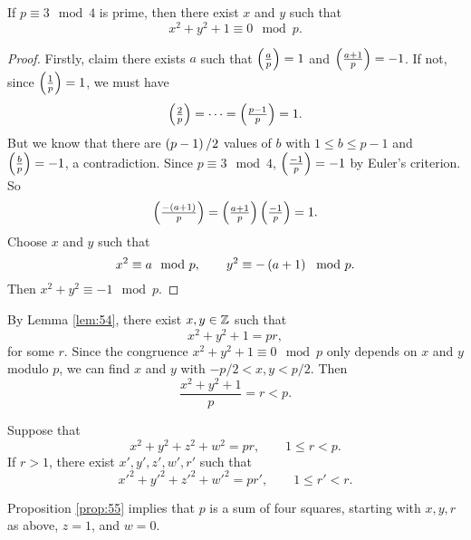 
\begin{lemma}
\label{lem:54}
If $ p \equiv 3 \mod 4 $ is prime, then there exist $ x $ and $ y $ such that
$$ x^2 + y^2 + 1 \equiv 0 \mod p. $$
\end{lemma}

\begin{proof}
Firstly, claim there exists $ a $ such that $ \symbol{a}{p} = 1 $ and $ \symbol{a + 1}{p} = -1 $. If not, since $ \symbol{1}{p} = 1 $, we must have
$$ \symbol{2}{p} = \dots = \symbol{p - 1}{p} = 1. $$
But we know that there are $ \br{p - 1} / 2 $ values of $ b $ with $ 1 \le b \le p - 1 $ and $ \symbol{b}{p} = -1 $, a contradiction. Since $ p \equiv 3 \mod 4 $, $ \symbol{-1}{p} = -1 $ by Euler's criterion. So
$$ \symbol{-\br{a + 1}}{p} = \symbol{a + 1}{p}\symbol{-1}{p} = 1. $$
Choose $ x $ and $ y $ such that
$$ x^2 \equiv a \mod p, \qquad y^2 \equiv -\br{a + 1} \mod p. $$
Then $ x^2 + y^2 \equiv -1 \mod p $.
\end{proof}

By Lemma \ref{lem:54}, there exist $ x, y \in \mathbb{Z} $ such that
$$ x^2 + y^2 + 1 = pr, $$
for some $ r $. Since the congruence $ x^2 + y^2 + 1 \equiv 0 \mod p $ only depends on $ x $ and $ y $ modulo $ p $, we can find $ x $ and $ y $ with $ -p / 2 < x, y < p / 2 $. Then
$$ \dfrac{x^2 + y^2 + 1}{p} = r < p. $$

\begin{proposition}
\label{prop:55}
Suppose that
$$ x^2 + y^2 + z^2 + w^2 = pr, \qquad 1 \le r < p. $$
If $ r > 1 $, there exist $ x', y', z', w', r' $ such that
$$ x'^2 + y'^2 + z'^2 + w'^2 = pr', \qquad 1 \le r' < r. $$
\end{proposition}

Proposition \ref{prop:55} implies that $ p $ is a sum of four squares, starting with $ x, y, r $ as above, $ z = 1 $, and $ w = 0 $.

